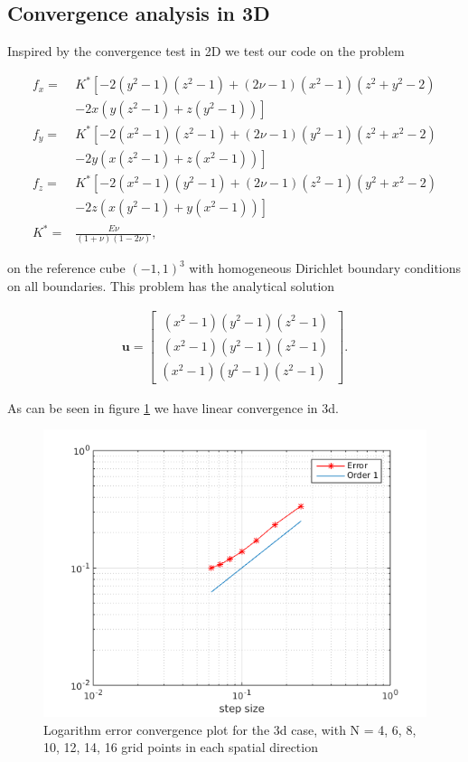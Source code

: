 

\subsection{Convergence analysis in 3D}

Inspired by the convergence test in 2D we test our code on the problem 

\begin{align}
f_x = &K^* \left[-2(y^2-1)(z^2-1) + (2 \nu -1)(x^2-1)(z^2 +y^2-2) \right.\nonumber\\
 &\left. -2x(y(z^2-1) + z(y^2-1)) \right] \\
 f_y = &K^* \left[-2(x^2-1)(z^2-1) + (2 \nu -1)(y^2-1)(z^2 +x^2-2) \right.\nonumber\\
 &\left. -2y(x(z^2-1) + z(x^2-1)) \right] \\
 f_z = &K^* \left[-2(x^2-1)(y^2-1) + (2 \nu -1)(z^2-1)(y^2 +x^2-2) \right.\nonumber\\
 &\left. -2z(x(y^2-1) + y(x^2-1)) \right] \\
 K^* = & \frac{E \nu}{(1+\nu)(1-2\nu)},
\end{align}


on the reference cube $(-1,1)^3$ with homogeneous Dirichlet boundary conditions on all boundaries. This problem has the analytical solution

\begin{align}
\bm{u} = \begin{bmatrix}
\, (x^2-1)(y^2-1)(z^2-1) \, \\
\, (x^2-1)(y^2-1)(z^2-1) \, \\
(x^2-1)(y^2-1)(z^2-1)
\end{bmatrix}.
\end{align}

As can be seen in figure \ref{fig:convergence3d} we have linear convergence in 3d.

\begin{figure}
\center
\includegraphics[scale=0.5]{convergence3d}
\caption{Logarithm error convergence plot for the 3d case, with N = 4, 6, 8, 10, 12, 14, 16 grid points in each spatial direction}
\label{fig:convergence3d}
\end{figure}

